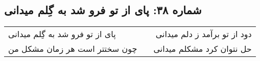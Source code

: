 \begin{center}
\section*{شماره ۳۸: پای از تو فرو شد به گِلم میدانی}
\label{sec:038}
\begin{longtable}{l p{0.5cm} r}
پای از تو فرو شد به گِلم میدانی
&&
دود از تو برآمد ز دلم میدانی
\\
چون سختتر است هر زمان مشکل من
&&
حل نتوان کرد مشکلم میدانی
\\
\end{longtable}
\end{center}
